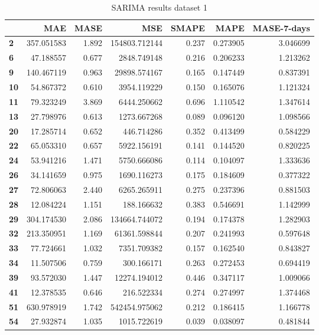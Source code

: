 \begin{table}[h]
    \centering
    \caption{SARIMA results dataset 1}
    \label{table:results:SARIMA:dataset1}
    \begin{tabular}{lrrrrrr}
    \toprule
    {} &         MAE &   MASE &            MSE &  SMAPE &      MAPE &  MASE-7-days \\
    \midrule
    \textbf{2 } &  357.051583 &  1.892 &  154803.712144 &  0.237 &  0.273905 &     3.046699 \\
    \textbf{6 } &   47.188557 &  0.677 &    2848.749148 &  0.216 &  0.206233 &     1.213262 \\
    \textbf{9 } &  140.467119 &  0.963 &   29898.574167 &  0.165 &  0.147449 &     0.837391 \\
    \textbf{10} &   54.867372 &  0.610 &    3954.119229 &  0.150 &  0.165076 &     1.121324 \\
    \textbf{11} &   79.323249 &  3.869 &    6444.250662 &  0.696 &  1.110542 &     1.347614 \\
    \textbf{13} &   27.798976 &  0.613 &    1273.667268 &  0.089 &  0.096120 &     1.098566 \\
    \textbf{20} &   17.285714 &  0.652 &     446.714286 &  0.352 &  0.413499 &     0.584229 \\
    \textbf{22} &   65.053310 &  0.657 &    5922.156191 &  0.141 &  0.144520 &     0.820225 \\
    \textbf{24} &   53.941216 &  1.471 &    5750.666086 &  0.114 &  0.104097 &     1.333636 \\
    \textbf{26} &   34.141659 &  0.975 &    1690.116273 &  0.175 &  0.184609 &     0.377322 \\
    \textbf{27} &   72.806063 &  2.440 &    6265.265911 &  0.275 &  0.237396 &     0.881503 \\
    \textbf{28} &   12.084224 &  1.151 &     188.166632 &  0.383 &  0.546691 &     1.142999 \\
    \textbf{29} &  304.174530 &  2.086 &  134664.744072 &  0.194 &  0.174378 &     1.282903 \\
    \textbf{32} &  213.350951 &  1.169 &   61361.598844 &  0.207 &  0.241993 &     0.597648 \\
    \textbf{33} &   77.724661 &  1.032 &    7351.709382 &  0.157 &  0.162540 &     0.843827 \\
    \textbf{34} &   11.507506 &  0.759 &     300.166171 &  0.263 &  0.272453 &     0.694419 \\
    \textbf{39} &   93.572030 &  1.447 &   12274.194012 &  0.446 &  0.347117 &     1.009066 \\
    \textbf{41} &   12.378535 &  0.646 &     216.522334 &  0.274 &  0.274997 &     1.374468 \\
    \textbf{51} &  630.978919 &  1.742 &  542454.975062 &  0.212 &  0.186415 &     1.166778 \\
    \textbf{54} &   27.932874 &  1.035 &    1015.722619 &  0.039 &  0.038097 &     0.481844 \\
    \bottomrule
    \end{tabular}
\end{table}
